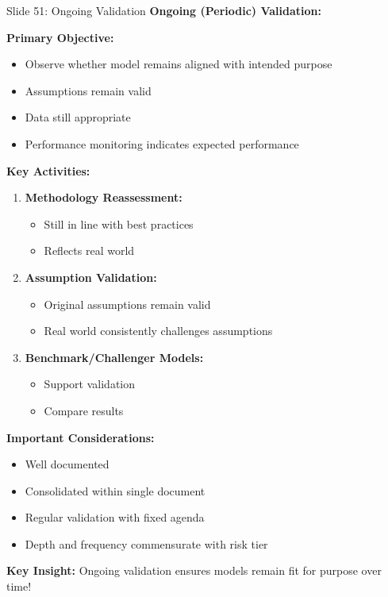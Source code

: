 \documentclass[8pt]{beamer}
\begin{document}
	\begin{frame}{Slide 51: Ongoing Validation}
		\fontsize{6.5}{7.5}\selectfont
		\textbf{Ongoing (Periodic) Validation:}
		
		\vspace{0.1cm}
		\textbf{Primary Objective:}
		\begin{itemize}
			\item Observe whether model remains aligned with intended purpose
			\item Assumptions remain valid
			\item Data still appropriate
			\item Performance monitoring indicates expected performance
		\end{itemize}
		
		\vspace{0.1cm}
		\textbf{Key Activities:}
		\begin{enumerate}
			\item \textbf{Methodology Reassessment:}
			\begin{itemize}
				\item Still in line with best practices
				\item Reflects real world
			\end{itemize}
			\item \textbf{Assumption Validation:}
			\begin{itemize}
				\item Original assumptions remain valid
				\item Real world consistently challenges assumptions
			\end{itemize}
			\item \textbf{Benchmark/Challenger Models:}
			\begin{itemize}
				\item Support validation
				\item Compare results
			\end{itemize}
		\end{enumerate}
		
		\vspace{0.1cm}
		\textbf{Important Considerations:}
		\begin{itemize}
			\item Well documented
			\item Consolidated within single document
			\item Regular validation with fixed agenda
			\item Depth and frequency commensurate with risk tier
		\end{itemize}
		
		\textcolor{myblue}{\textbf{Key Insight:}} Ongoing validation ensures \textcolor{myblue}{models remain fit for purpose over time}!
	\end{frame}
	
\end{document}
